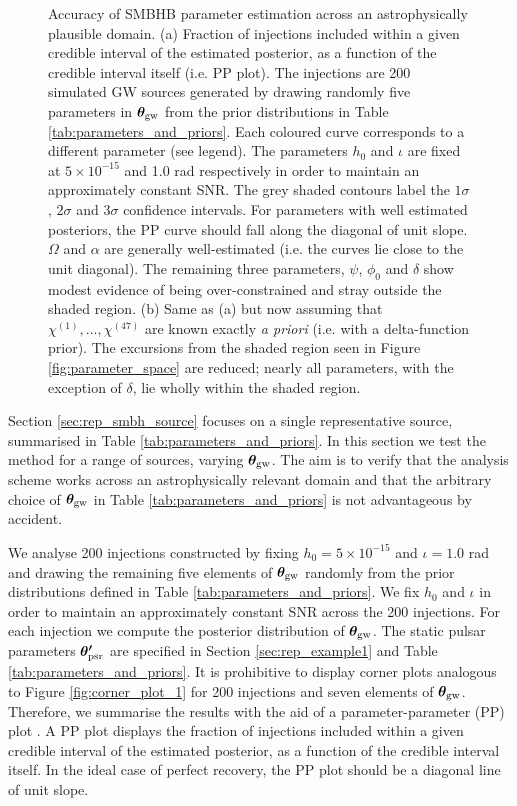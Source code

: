 \documentclass[fleqn,usenatbib,useAMS]{mnras}
\begin{document}
\begin{figure}
	\caption{Accuracy of SMBHB parameter estimation across an astrophysically plausible domain. (a) Fraction of injections included within a given credible interval of the estimated posterior, as a function of the credible interval itself (i.e. PP plot). The injections are 200 simulated GW sources generated by drawing randomly five parameters in $\boldsymbol{\theta}_{\rm gw}$ from the prior distributions in Table \ref{tab:parameters_and_priors}. Each coloured curve corresponds to a different parameter (see legend). The parameters $h_0$ and $\iota$ are fixed at $5 \times 10^{-15}$ and 1.0 rad respectively in order to maintain an approximately constant SNR. The grey shaded contours label the $1\sigma$, $2\sigma$ and 3$\sigma$ confidence intervals. For parameters with well estimated posteriors, the PP curve should fall along the diagonal of unit slope. $\Omega$ and $\alpha$ are generally well-estimated (i.e. the curves lie close to the unit diagonal). The remaining three parameters, $\psi$, $\phi_0$ and $\delta$ show modest evidence of being over-constrained and stray outside the shaded region. (b) Same as (a) but now assuming that $\chi^{(1)}, \dots, \chi^{(47)}$ are known exactly \textit{a priori} (i.e. with a delta-function prior). The excursions from the shaded region seen in Figure  \ref{fig:parameter_space} are reduced; nearly all parameters, with the exception of $\delta$, lie wholly within the shaded region. } \label{fig:AB}
\end{figure}


Section \ref{sec:rep_smbh_source} focuses on a single representative source, summarised in Table \ref{tab:parameters_and_priors}. In this section we test the method for a range of sources, varying $\boldsymbol{\theta}_{\rm gw}$. The aim is to verify that the analysis scheme works across an astrophysically relevant domain and that the arbitrary choice of $\boldsymbol{\theta}_{\rm gw}$ in Table \ref{tab:parameters_and_priors} is not advantageous by accident. \newline 

We analyse 200 injections constructed by fixing $h_0 = 5 \times 10^{-15}$ and $\iota =1.0$ rad and drawing the remaining five elements of $\boldsymbol{\theta}_{\rm gw}$ randomly from the prior distributions defined in Table \ref{tab:parameters_and_priors}. We fix $h_0$ and $\iota$ in order to maintain an approximately constant SNR across the 200 injections. For each injection we compute the posterior distribution of ${\boldsymbol{\theta}}_{\rm gw}$. The static pulsar parameters $\boldsymbol{\theta'}_{\rm psr}$ are specified in Section \ref{sec:rep_example1} and Table \ref{tab:parameters_and_priors}. It is prohibitive to display corner plots analogous to Figure \ref{fig:corner_plot_1} for 200 injections and seven elements of $\boldsymbol{\theta}_{\rm gw}$. Therefore, we summarise the results with the aid of a parameter-parameter (PP) plot \citep{doi:10.1198/106186006X136976}. A PP plot displays the fraction of injections included within a given credible interval of the estimated posterior, as a function of the credible interval itself. In the ideal case of perfect recovery, the PP plot should be a diagonal line of unit slope. \newline 
 
\end{document}

